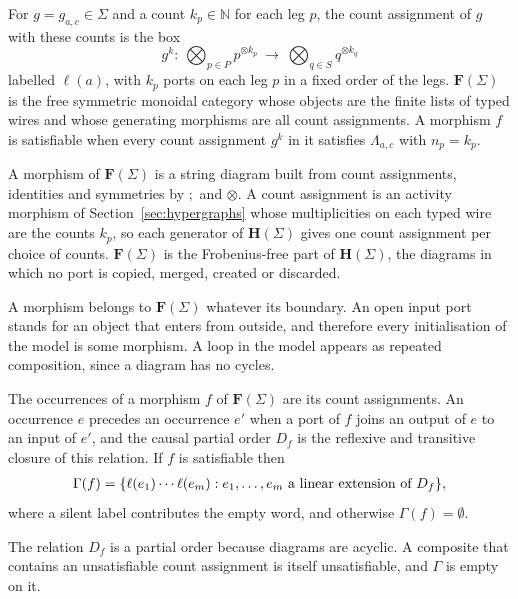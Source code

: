 \begin{definition}
  \label{def:free-category}
  For $g=g_{a,c}\in\Sigma$ and a count $k_p\in\mathbb{N}$ for each leg $p$, the count assignment of
  $g$ with these counts is the box
  \[
    g^{k}:\ \textstyle\bigotimes_{p\in P}p^{\otimes k_p}\ \to\ \bigotimes_{q\in S}q^{\otimes k_q}
  \]
  labelled $\ell(a)$, with $k_p$ ports on each leg $p$ in a fixed order of the legs.
  $\mathbf{F}(\Sigma)$ is the free symmetric monoidal category whose objects are the finite lists of typed wires and
  whose generating morphisms are all count assignments. A morphism $f$ is satisfiable when every count
  assignment $g^k$ in it satisfies $\Lambda_{a,c}$ with $n_p=k_p$.
\end{definition}

A morphism of $\mathbf{F}(\Sigma)$ is a string diagram built from count assignments, identities and
symmetries by $;$ and $\otimes$. A count assignment is an activity morphism of
Section~\ref{sec:hypergraphs} whose multiplicities on each typed wire are the counts $k_p$, so each
generator of $\mathbf{H}(\Sigma)$ gives one count assignment per choice of counts. $\mathbf{F}(\Sigma)$ is
the Frobenius-free part of $\mathbf{H}(\Sigma)$, the diagrams in which no port is copied, merged,
created or discarded.

A morphism belongs to $\mathbf{F}(\Sigma)$ whatever its boundary. An open input port stands
for an object that enters from outside, and therefore every initialisation of the model is some
morphism. A loop in the model appears as repeated composition, since a diagram has no cycles.

\begin{definition}
  \label{def:trace-map}
  The occurrences of a morphism $f$ of $\mathbf{F}(\Sigma)$ are its count assignments. An occurrence $e$ precedes an occurrence
  $e'$ when a port of $f$ joins an output of $e$ to an input of $e'$, and the causal partial
  order $D_f$ is the reflexive and transitive closure of this relation. If $f$ is satisfiable then
  \begin{gather*}
    \Gamma(f)=\{\ell(e_1)\cdots\ell(e_m) :
      e_1,\dots,e_m \text{ a linear extension of } D_f\},
  \end{gather*}
  where a silent label contributes the empty word, and otherwise $\Gamma(f)=\emptyset$.
\end{definition}

The relation $D_f$ is a partial order because diagrams are acyclic. A composite that contains
an unsatisfiable count assignment is itself unsatisfiable, and $\Gamma$ is empty on it.

